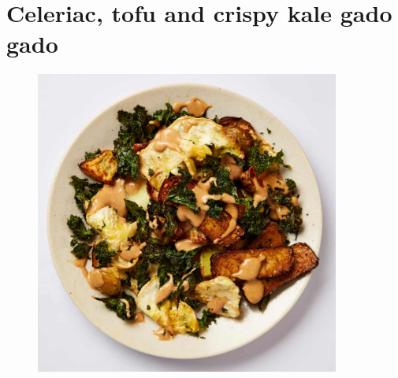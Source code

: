 \documentclass{book}
\begin{document}
\section{Celeriac, tofu and crispy kale gado gado}
\begin{figure}
\centering\includegraphics[width=10cm,height=10cm,keepaspectratio]{Recipe_Pictures/Celeriac,_tofu_and_crispy_kale_gado_gado.png}
\end{figure}
\end{document}
